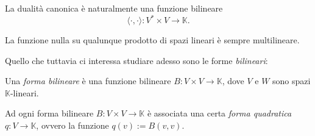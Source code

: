 \documentclass[11pt]{scrartcl}
\newcommand{\KK}{\mathbb{K}}
\begin{document}
	\begin{example}
		La dualità canonica è naturalmente una funzione bilineare 
		$$\langle\cdot,\cdot\rangle:V^*\times V \to \KK.$$
	\end{example}
	
	\begin{example}
		La funzione nulla su qualunque prodotto di spazi lineari è sempre multilineare.
	\end{example}
	
	Quello che tuttavia ci interessa studiare adesso sono le forme \textit{bilineari}:
	\begin{definition}
		Una \textit{forma bilineare} è una funzione bilineare $B:V\times V\to \KK$, dove $V$ e $W$ sono spazi $\KK$-lineari.
	\end{definition}
	\begin{definition}
		Ad ogni forma bilineare $B:V\times V\to \KK$ è associata una certa \textit{forma quadratica} $q:V\to \KK$, ovvero la funzione $q(v):=B(v,v)$.
	\end{definition}
\end{document}
